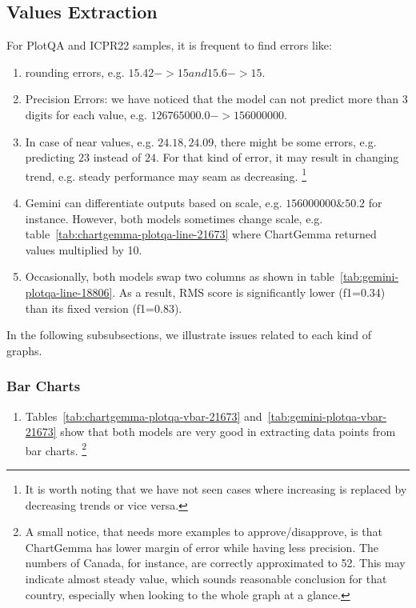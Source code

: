 \documentclass[
	letterpaper, %
]{jdf}
\begin{document}
\subsection{Values Extraction}\label{ssect:values-extraction}
For PlotQA and ICPR22 samples, it is frequent to find errors like:
\begin{enumerate}
     \item rounding errors, e.g. $15.42->15 and 15.6->15$.
     \item Precision Errors: we have noticed that the model can not predict more than 3 digits for each value, e.g. $126765000.0->156000000$.
     \item In case of near values, e.g. $24.18, 24.09$, there might be some errors, e.g. predicting $23$ instead of $24$.
       For that kind of error, it may result in changing trend, e.g. steady performance may seam as decreasing.
       \footnote{It is worth noting that we have not seen cases where increasing is replaced by decreasing trends or vice versa.}
       \item Gemini can differentiate outputs based on scale, e.g. $156000000 \& 50.2$ for instance.
         However, both models sometimes change scale, e.g. table~\ref{tab:chartgemma-plotqa-line-21673} where ChartGemma returned values multiplied by 10.
       \item Occasionally, both models swap two columns as shown in table~\ref{tab:gemini-plotqa-line-18806}.
         As a result, RMS score is significantly lower (f1=0.34) than its fixed version (f1=0.83).
       \end{enumerate}

       In the following subsubsections, we illustrate issues related to each kind of graphs.

\subsubsection{Bar Charts}\label{sssect:bar-errors}
\begin{enumerate}
  \item Tables~\ref{tab:chartgemma-plotqa-vbar-21673} and~\ref{tab:gemini-plotqa-vbar-21673} show that both models are very good in extracting data points from bar charts.
    \footnote{A small notice, that needs more examples to approve/disapprove, is that ChartGemma has lower margin of error while having less precision. The numbers of Canada, for instance, are correctly approximated to 52. This may indicate almost steady value, which sounds reasonable conclusion for that country, especially when looking to the whole graph at a glance.}
       \end{enumerate}
\end{document}

